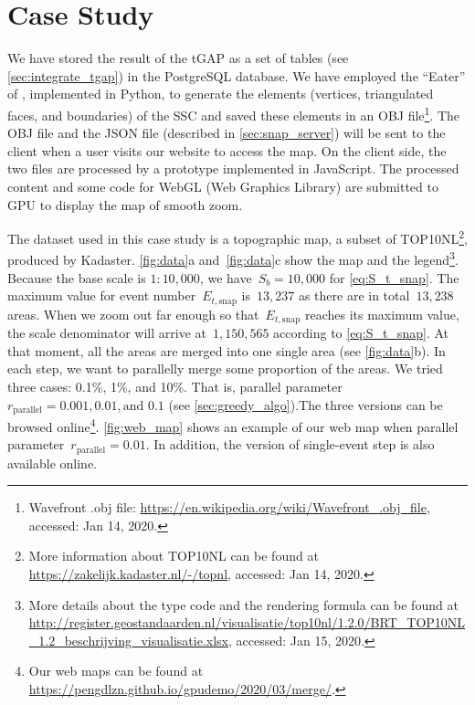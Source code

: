 \documentclass[ijgi,article,submit,moreauthors,pdftex]{Definitions/mdpi}
\begin{document}


\section{Case Study}
\label{sec:case_study}

We have stored the result of the tGAP 
as a set of tables (see \sect\ref{sec:integrate_tgap}) 
in the PostgreSQL database.
We have employed the ``Eater'' of \citet{Suba2014Merge},
implemented in Python, 
to generate the elements
(vertices, triangulated faces, and boundaries)
of the SSC \citep{vanOosterom2014tGAPSSC} 
and saved these elements in an OBJ file\footnote{%
Wavefront .obj file:
\url{https://en.wikipedia.org/wiki/Wavefront_.obj_file},
accessed: Jan 14, 2020.}.
%
The OBJ file and the JSON file (described in \sect\ref{sec:snap_server}) 
will be sent to the client 
when a user visits our website to access the map.
On the client side,
the two files are processed
by a prototype implemented in JavaScript.
The processed content and some code for WebGL (Web Graphics Library)
are submitted to GPU to display the map of smooth zoom.

The dataset used in this case study is a topographic map, 
a subset of TOP10NL\footnote{%
More information about TOP10NL can be found at
\url{https://zakelijk.kadaster.nl/-/topnl},
accessed: Jan 14, 2020.},
produced by Kadaster.
%
\figs\ref{fig:data}a and~\ref{fig:data}c show the map and the legend\footnote{%
More details about the type code and the rendering formula can be found at
\url{http://register.geostandaarden.nl/visualisatie/top10nl/1.2.0/BRT_TOP10NL_1.2_beschrijving_visualisatie.xlsx},
accessed: Jan 15, 2020.}.
%
Because the base scale is $1:10{,}000$, 
we have~$S_b = 10{,}000$ for \eq\ref{eq:S_t_snap}.
The maximum value for event number~$E_{t,\mathrm{snap}}$ is~$13{,}237$
as there are in total~$13{,}238$ areas.
When we zoom out far enough 
so that~$E_{t,\mathrm{snap}}$ reaches its maximum value,
the scale denominator will arrive at~$1{,}150{,}565$
according to \eq\ref{eq:S_t_snap}.
At that moment, all the areas are merged into one single area
(see \figs\ref{fig:data}b).
In each step, we want to parallelly merge some proportion of the areas.
We tried three cases: 0.1\%, 1\%, and 10\%.
That is, parallel parameter~$r_\mathrm{parallel}=0.001, 0.01, \text{and~} 0.1$ 
(see \sect\ref{sec:greedy_algo}).The three versions can be browsed online\footnote{%
Our web maps can be found at
\url{https://pengdlzn.github.io/gpudemo/2020/03/merge/}.}. 
\fig\ref{fig:web_map} shows an example of our web map when 
parallel parameter~$r_\mathrm{parallel}=0.01$.
In addition, the version of single-event step is also available online.
\end{document}
